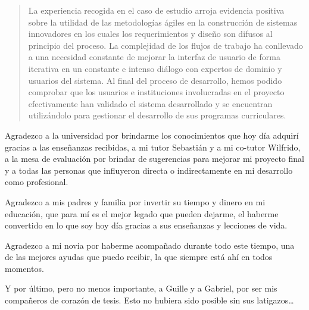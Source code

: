 \documentclass[
11pt, %
english, %
spanish,
singlespacing, %
liststotoc, %
parskip, %
headsepline, %
]{MastersDoctoralThesis} %
\begin{document}
\begin{abstract}
La experiencia recogida en el caso de estudio arroja evidencia positiva sobre la utilidad de las metodologías ágiles en la construcción de sistemas innovadores en los cuales los requerimientos y diseño son difusos al principio del proceso. La complejidad de los flujos de trabajo ha conllevado a una necesidad constante de mejorar la interfaz de usuario de forma iterativa en un constante e intenso diálogo con expertos de dominio y usuarios del sistema. Al final del proceso de desarrollo, hemos podido comprobar que los usuarios e instituciones involucradas en el proyecto efectivamente han validado el sistema desarrollado y se encuentran utilizándolo para gestionar el desarrollo de sus programas curriculares.


\end{abstract}


\renewcommand{\acknowledgementname}{Agradecimientos}

\begin{acknowledgements}
\addchaptertocentry{\acknowledgementname} %
Agradezco a la universidad por brindarme los conocimientos que hoy día adquirí gracias a las enseñanzas recibidas, a mi tutor Sebastián y a mi co-tutor Wilfrido, a la mesa de evaluación por brindar de sugerencias para mejorar mi proyecto final y a todas las personas que influyeron directa o indirectamente en mi desarrollo como profesional.

Agradezco a mis padres y familia por invertir su tiempo y dinero en mi educación, que para mí es el mejor legado que pueden dejarme, el haberme convertido en lo que soy hoy día gracias a sus enseñanzas y lecciones de vida.

Agradezco a mi novia por haberme acompañado durante todo este tiempo, una de las mejores ayudas que puedo recibir, la que siempre está ahí en todos momentos.

Y por último, pero no menos importante, a Guille y a Gabriel, por ser mis compañeros de corazón de tesis. Esto no hubiera sido posible sin sus latigazos\ldots

\end{acknowledgements}

\end{document}
